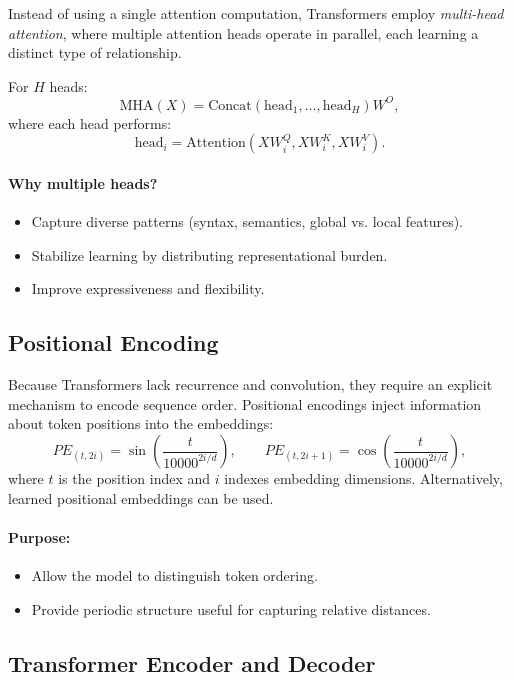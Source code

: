 \documentclass[12pt,a4paper]{report}
\begin{document}
Instead of using a single attention computation, Transformers employ \textit{multi-head attention}, where multiple attention heads operate in parallel, each learning a distinct type of relationship.

For $H$ heads:
\[
\text{MHA}(X) = \text{Concat}(\text{head}_1, \dots, \text{head}_H)W^O,
\]
where each head performs:
\[
\text{head}_i = \text{Attention}(XW_i^Q, XW_i^K, XW_i^V).
\]

\paragraph{Why multiple heads?}
\begin{itemize}
    \item Capture diverse patterns (syntax, semantics, global vs. local features).
    \item Stabilize learning by distributing representational burden.
    \item Improve expressiveness and flexibility.
\end{itemize}

\vspace{1em}
\subsection{Positional Encoding}

Because Transformers lack recurrence and convolution, they require an explicit mechanism to encode sequence order.  
Positional encodings inject information about token positions into the embeddings:
\[
PE_{(t,2i)} = \sin\left( \frac{t}{10000^{2i/d}} \right),
\qquad
PE_{(t,2i+1)} = \cos\left( \frac{t}{10000^{2i/d}} \right),
\]
where $t$ is the position index and $i$ indexes embedding dimensions.  
Alternatively, learned positional embeddings can be used.

\paragraph{Purpose:}
\begin{itemize}
    \item Allow the model to distinguish token ordering.
    \item Provide periodic structure useful for capturing relative distances.
\end{itemize}

\vspace{1em}
\subsection{Transformer Encoder and Decoder}
\end{document}
